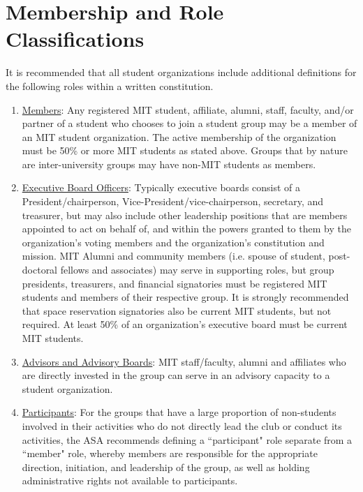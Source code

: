 \documentclass[12pt]{constitution}
\def\ul{\underline}
\begin{document}
\section{Membership and Role Classifications}
\label{groups_membership}
It is recommended that all student organizations include additional definitions for the following roles
    within a written constitution.
\begin{enumerate}
    \item \ul{Members}: Any registered MIT student, affiliate, alumni, staff, faculty, and/or partner of a
        student who chooses to join a student group may be a member of an MIT student organization.
    The active membership of the organization must be 50\% or more MIT students as stated above.
    Groups that by nature are inter-university groups may have non-MIT students as members.

    \item \ul{Executive Board Officers}: Typically executive boards consist of a President/chairperson,
        Vice-President/vice-chairperson, secretary, and treasurer, but may also include other leadership
        positions that are members appointed to act on behalf of, and within the powers granted to them
        by the organization's voting members and the organization's constitution and mission.
    MIT Alumni and community members (i.e. spouse of student, post-doctoral fellows and associates) may serve
        in supporting roles, but group presidents, treasurers, and financial signatories must be registered MIT
        students and members of their respective group.
    It is strongly recommended that space reservation signatories also be current MIT students, but not required.
    At least 50\% of an organization's executive board must be current MIT students.

    \item \ul{Advisors and Advisory Boards}: MIT staff/faculty, alumni and affiliates who are directly invested in
        the group can serve in an advisory capacity to a student organization.

    \item \ul{Participants}: For the groups that have a large proportion of non-students involved in their
        activities who do not directly lead the club or conduct its activities, the ASA recommends defining a
        ``participant" role separate from a ``member" role, whereby members are responsible for the appropriate
        direction, initiation, and leadership of the group, as well as holding administrative rights not available
        to participants.
\end{enumerate}
\end{document}
